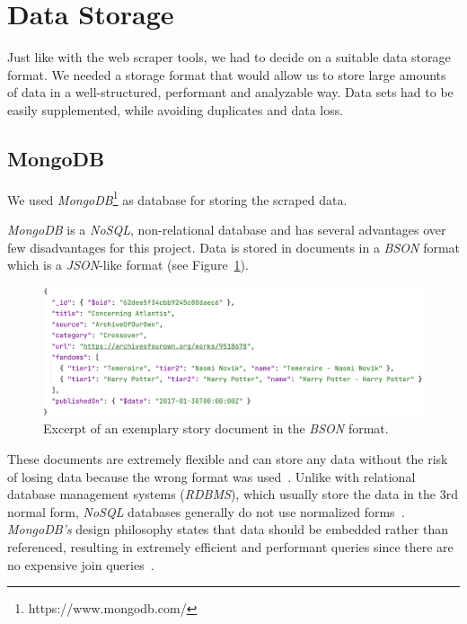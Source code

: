 \section{Data Storage}\label{sec:data-storage}

Just like with the web scraper tools, we had to decide on a suitable data storage format.
We needed a storage format that would allow us to store large amounts of data in a well-structured, performant and analyzable way.
Data sets had to be easily supplemented, while avoiding duplicates and data loss.

\subsection{MongoDB}\label{subsec:mongodb}
We used \emph{MongoDB}\footnote{https://www.mongodb.com/} as database for storing the scraped data.

\emph{MongoDB} is a \emph{NoSQL}, non-relational database and has several advantages over few disadvantages for this project.
Data is stored in documents in a \emph{BSON} format which is a \emph{JSON}-like format (see Figure~\ref{fig:bson-document}).  %

\begin{figure}[htp]
    \centering
    \includegraphics[width=\textwidth]{figures/bson_document}
    \caption[Excerpt of an exemplary story document in the \emph{BSON} format.]{Excerpt of an exemplary story document in the \emph{BSON} format.}
    \label{fig:bson-document}
\end{figure}

These documents are extremely flexible and can store any data without the risk of losing data because the wrong format was used~\citep{Bruce2021UnderstandingMongoDB}.
Unlike with relational database management systems (\emph{RDBMS}), which usually store the data in the 3rd normal form, \emph{NoSQL} databases generally do not use normalized forms~\citep{Chapple2022TheNormalization}.
\emph{MongoDB's} design philosophy states that data should be embedded rather than referenced, resulting in extremely efficient and performant queries since there are no expensive join queries~\citep{MongoDBAdvantagesMongoDB}.

